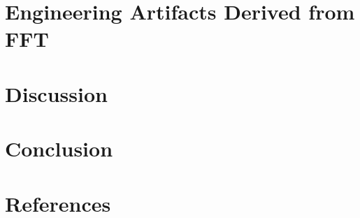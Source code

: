 \documentclass[11pt]{article}
\begin{document}
\newpage

\section{Engineering Artifacts Derived from FFT}

\newpage

\section{Discussion}

\newpage

\section{Conclusion}

\newpage

\section*{References}
\end{document}
